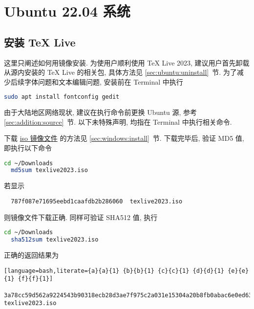 
\chapter{Ubuntu 22.04 系统}

\section{安装 \TeX{} Live}

这里只阐述如何用镜像安装.
为使用户顺利使用 \TeX{} Live 2023,
建议用户首先卸载从源内安装的 \TeX{} Live 的相关包,
具体方法见 \ref{sec:ubuntu:uninstall}~节.
为了减少后续字体问题和文本编辑问题,
安装前在 \textsf{Terminal} 中执行
\begin{lstlisting}[language=bash]
  sudo apt install fontconfig gedit
\end{lstlisting}
由于大陆地区网络现状,
建议在执行命令前更换 Ubuntu 源,
参考 \ref{sec:addition:source}~节.
以下未特殊声明,
均指在  \textsf{Terminal} 中执行相关命令.

下载
\href{https://mirrors.ctan.org/systems/texlive/Images/texlive2023.iso}{iso 镜像文件}
的方法见 \ref{sec:windows:install}~节.
下载完毕后,
验证 MD5 值,
即执行以下命令
\begin{lstlisting}[language = bash]
  cd ~/Downloads
  md5sum texlive2023.iso
\end{lstlisting}
若显示
\begin{lstlisting}
  787f087e71695eebd1caafdb2b286060  texlive2023.iso
\end{lstlisting}
则镜像文件下载正确.
同样可验证 SHA512 值,
执行
\begin{lstlisting}[language = bash]
  cd ~/Downloads
  sha512sum texlive2023.iso
\end{lstlisting}
正确的返回结果为
\begin{lstlisting}[language=bash,literate={a}{a}{1} {b}{b}{1} {c}{c}{1} {d}{d}{1} {e}{e}{1} {f}{f}{1}]
  3a78cc59d562a9224543b90318ecb28d3ae7f975c2a031e15304a20b8fb0abac6e0ed63012c0bdf8f5edd39380caf122a17c948c05b28ea38fe90f2f0b19bdba  texlive2023.iso
\end{lstlisting}

